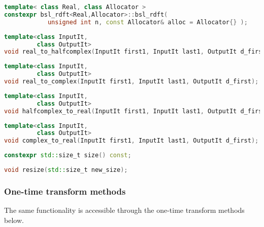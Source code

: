 \begin{lstlisting}[language=C++,caption=Real plan constructor.]
template< class Real, class Allocator >
constexpr bsl_rdft<Real,Allocator>::bsl_rdft(
            unsigned int n, const Allocator& alloc = Allocator{} );
\end{lstlisting}
\begin{lstlisting}[language=C++,caption=Real to halfcomplex.]
template<class InputIt,
         class OutputIt>
void real_to_halfcomplex(InputIt first1, InputIt last1, OutputIt d_first);
\end{lstlisting}
\begin{lstlisting}[language=C++,caption=Real to complex.]
template<class InputIt,
         class OutputIt>
void real_to_complex(InputIt first1, InputIt last1, OutputIt d_first);
\end{lstlisting}
\begin{lstlisting}[language=C++,caption=Halfcomplex to real.]
template<class InputIt,
         class OutputIt>
void halfcomplex_to_real(InputIt first1, InputIt last1, OutputIt d_first);
\end{lstlisting}
\begin{lstlisting}[language=C++,caption=Complex to real.]
template<class InputIt,
         class OutputIt>
void complex_to_real(InputIt first1, InputIt last1, OutputIt d_first);
\end{lstlisting}
\begin{lstlisting}[language=C++,caption=Size.]
constexpr std::size_t size() const;
\end{lstlisting}
\begin{lstlisting}[language=C++,caption=Resize.]
void resize(std::size_t new_size);
\end{lstlisting}

\subsubsection*{One-time transform methods}
The same functionality is accessible through the one-time transform methods
below.

